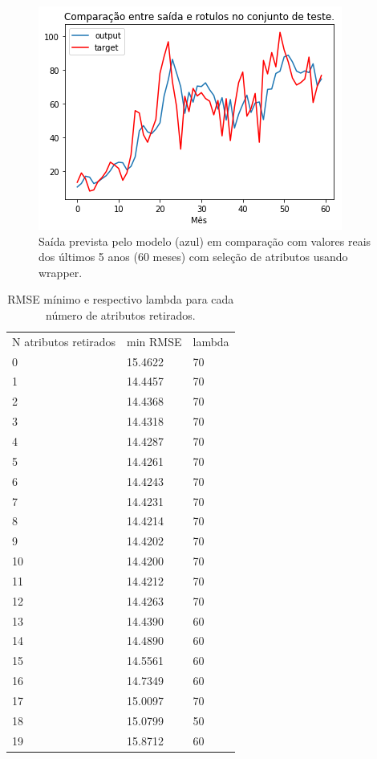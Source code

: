 \documentclass[a4paper, 12pt]{article}
\begin{document}
\begin{figure}[h!]
    \centering
    \includegraphics[width=10cm]{images/wrapper.png}
    \caption{Saída prevista pelo modelo (azul) em comparação com valores reais dos últimos 5 anos (60 meses) com seleção de atributos usando wrapper.}
\end{figure}


\begin{table}[]
    \centering
    \caption{RMSE mínimo e respectivo lambda para cada número de atributos retirados.}
\begin{tabular}{lll}
N atributos retirados & min RMSE & lambda \\
0                     & 15.4622 & 70     \\
1                     & 14.4457 & 70     \\
2                     & 14.4368 & 70     \\
3                     & 14.4318 & 70     \\
4                     & 14.4287 & 70     \\
5                     & 14.4261 & 70     \\
6                     & 14.4243 & 70     \\
7                     & 14.4231 & 70     \\
8                     & 14.4214 & 70     \\
9                     & 14.4202 & 70     \\
10                    & 14.4200 & 70     \\
11                    & 14.4212 & 70     \\
12                    & 14.4263 & 70     \\
13                    & 14.4390 & 60     \\
14                    & 14.4890 & 60     \\
15                    & 14.5561 & 60     \\
16                    & 14.7349 & 60     \\
17                    & 15.0097 & 70     \\
18                    & 15.0799 & 50     \\
19                    & 15.8712 & 60
\end{tabular}
\end{table}
\end{document}
